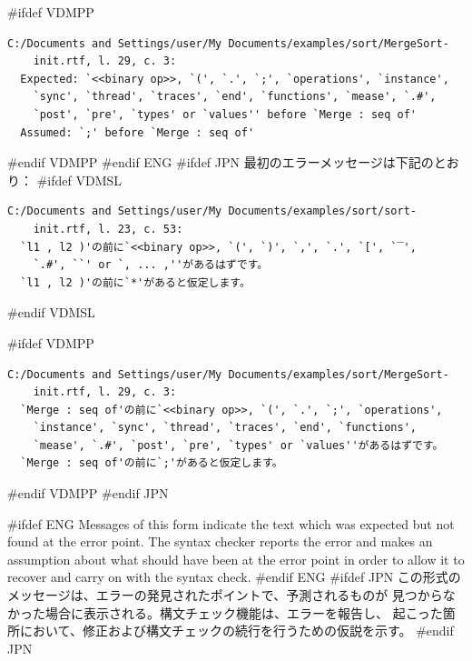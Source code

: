 \documentclass[\pformat,12pt]{article}
\begin{document}
#ifdef VDMPP
\begin{verbatim}
C:/Documents and Settings/user/My Documents/examples/sort/MergeSort-
    init.rtf, l. 29, c. 3:
  Expected: `<<binary op>>, `(', `.', `;', `operations', `instance',
    `sync', `thread', `traces', `end', `functions', `mease', `.#',
    `post', `pre', `types' or `values'' before `Merge : seq of'
  Assumed: `;' before `Merge : seq of'
\end{verbatim}
#endif VDMPP
#endif ENG
#ifdef JPN
最初のエラーメッセージは下記のとおり：
#ifdef VDMSL
\begin{verbatim}
C:/Documents and Settings/user/My Documents/examples/sort/sort-
    init.rtf, l. 23, c. 53:
  `l1 , l2 )'の前に`<<binary op>>, `(', `)', `,', `.', `[', `‾',
    `.#', ``' or `, ... ,''があるはずです。
  `l1 , l2 )'の前に`*'があると仮定します。
\end{verbatim}
#endif VDMSL

#ifdef VDMPP
\begin{verbatim}
C:/Documents and Settings/user/My Documents/examples/sort/MergeSort-
    init.rtf, l. 29, c. 3:
  `Merge : seq of'の前に`<<binary op>>, `(', `.', `;', `operations',
    `instance', `sync', `thread', `traces', `end', `functions',
    `mease', `.#', `post', `pre', `types' or `values''があるはずです。
  `Merge : seq of'の前に`;'があると仮定します。
\end{verbatim}
#endif VDMPP
#endif JPN

#ifdef ENG
Messages of this form indicate the text which was expected but not
found at the error point. The syntax checker reports the error and
makes an assumption about what should have been at the error point in
order to allow it to recover and carry on with the syntax check.
#endif ENG
#ifdef JPN
この形式のメッセージは、エラーの発見されたポイントで、予測されるものが
見つからなかった場合に表示される。構文チェック機能は、エラーを報告し、
起こった箇所において、修正および構文チェックの続行を行うための仮説を示す。
#endif JPN
\end{document}
